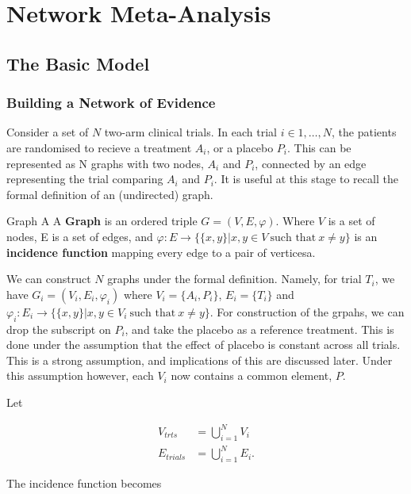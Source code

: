\chapter{Network Meta-Analysis}%

\section{The Basic Model}

\subsection{Building a Network of Evidence}

Consider a set of $N$ two-arm clinical trials. In each trial $i \in 1,\ldots,N$, the patients are randomised to recieve a treatment $A_i$, or a placebo $P_i$. This can be represented as N graphs with two nodes, $A_i$ and $P_i$, connected by an edge representing the trial comparing $A_i$ and $P_i$. It is useful at this stage to recall the formal definition of an (undirected) graph. 

\begin{definition}{Graph}
A  A \textbf{Graph} is an ordered triple $G = (V, E, \varphi)$. Where  $V$ is a set of nodes, E is a set  of edges, and $\varphi : E \to \{\{ x, y \} | x, y \in V \ \text{such that} \ x \neq y \}$ is an  \textbf{incidence function} mapping every edge to a pair of verticesa.
\end{definition}

We can construct $N$ graphs under the formal definition. Namely, for trial $T_i$, we have $G_i = (V_i, E_i, \varphi_i)$ where $V_i = \{ A_i, P_i \}$, $E_i = \{T_i\}$ and $\varphi_i : E_i \to \{ \{ x, y \} | x, y \in V_i \ \text{such that} \  x \neq y \}$. For construction of the grpahs, we can drop the subscript on $P_i$, and take the placebo as a reference treatment. This is done under the assumption that the effect of placebo is constant across all trials. This is a strong assumption, and implications of this are discussed later. Under this assumption however, each $V_i$ now contains a common element, $P$.

Let

\begin{align*}
    V_{trts} &= \bigcup_{i=1}^{N} V_i \\
    E_{trials} &= \bigcup_{i=1}^{N} E_i
.\end{align*}

The incidence function becomes 

